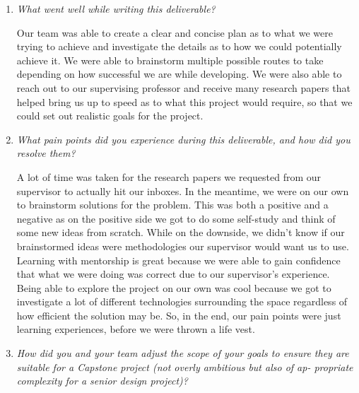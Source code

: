 \documentclass{article}
\begin{document}
\begin{enumerate}
    \item \textit{What went well while writing this deliverable?}
    
    Our team was able to create a clear and concise plan as to what we were trying to achieve and investigate the details as to how we could potentially achieve it. We were able to brainstorm multiple possible routes to take depending on how successful we are while developing. We were also able to reach out to our supervising professor and receive many research papers that helped bring us up to speed as to what this project would require, so that we could set out realistic goals for the project.
    \item \textit{What pain points did you experience during this deliverable, and how did you resolve them?}
    
    A lot of time was taken for the research papers we requested from our supervisor to actually hit our inboxes. In the meantime, we were on our own to brainstorm solutions for the problem. This was both a positive and a negative as on the positive side we got to do some self-study and think of some new ideas from scratch. While on the downside, we didn’t know if our brainstormed ideas were methodologies our supervisor would want us to use. Learning with mentorship is great because we were able to gain confidence that what we were doing was correct due to our supervisor’s experience. Being able to explore the project on our own was cool because we got to investigate a lot of different technologies surrounding the space regardless of how efficient the solution may be. So, in the end, our pain points were just learning experiences, before we were thrown a life vest.
    

    \item \textit{How did you and your team adjust the scope of your goals to ensure they
    are suitable for a Capstone project (not overly ambitious but also of ap-
    propriate complexity for a senior design project)?}


\end{enumerate}
\end{document}
